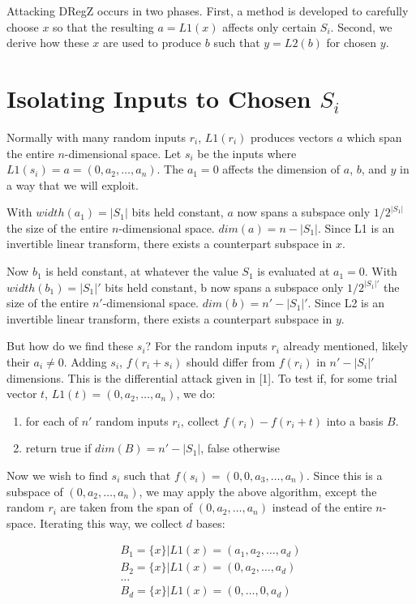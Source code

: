 \documentclass{article}
\begin{document}
Attacking DRegZ occurs in two phases. First, a method is developed to carefully choose $x$ so that the resulting $a = L1(x)$ affects only certain $S_i$.
Second, we derive how these $x$ are used to produce $b$ such that $y = L2(b)$ for chosen $y$.

\section{Isolating Inputs to Chosen $S_i$}

Normally with many random inputs $r_i$, $L1(r_i)$ produces vectors $a$ which span the entire $n$-dimensional space.
Let $s_i$ be the inputs where $L1(s_i) = a = (0, a_2,\ldots ,a_n)$.
The $a_1=0$ affects the dimension of $a$, $b$, and $y$ in a way that we will exploit.

With $width(a_1) = |S_1|$ bits held constant, $a$ now spans a subspace only $1/2^{|S_1|}$ the size of the entire $n$-dimensional space. $dim(a)=n-|S_1|$.
Since L1 is an invertible linear transform, there exists a counterpart subspace in $x$.

Now $b_1$ is held constant, at whatever the value $S_1$ is evaluated at $a_1=0$.
With $width(b_1) = |S_1|'$ bits held constant, b now spans a subspace only $1/2^{|S_1|'}$ the size of the entire $n'$-dimensional space. $dim(b)=n'-|S_1|'$.
Since L2 is an invertible linear transform, there exists a counterpart subspace in $y$.

But how do we find these $s_i$? For the random inputs $r_i$ already mentioned, likely their $a_i\neq 0$.
Adding $s_i$, $f(r_i+s_i)$ should differ from $f(r_i)$ in $n' - |S_i|'$ dimensions.
This is the differential attack given in [1].
To test if, for some trial vector $t$, $L1(t) = (0, a_2,\ldots , a_n)$, we do:

\begin{enumerate}
\item for each of $n'$ random inputs $r_i$, collect $f(r_i) - f(r_i + t)$ into a basis $B$.
\item return true if $dim(B) = n' - |S_1|$, false otherwise
\end{enumerate}

Now we wish to find $s_i$ such that $f(s_i) = (0, 0, a_3, \ldots , a_n)$. Since this is a subspace of $(0, a_2, \ldots , a_n)$, we may apply the above
algorithm, except the random $r_i$ are taken from the span of $(0, a_2, \ldots , a_n)$ instead of the entire $n$-space.
Iterating this way, we collect $d$ bases:

\begin{align*}
B_1 = \{x\} | L1(x) = (a_1, a_2, \ldots , a_d) \\
B_2 = \{x\} | L1(x) = (0, a_2,\ldots , a_d) \\
\ldots \\
B_d = \{x\} | L1(x) = (0,\ldots , 0, a_d) \\
\end{align*}
\end{document}
